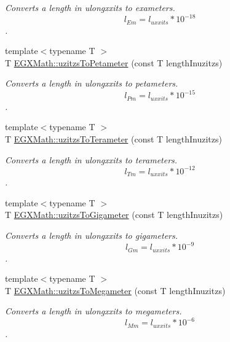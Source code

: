 \begin{DoxyCompactItemize}
\begin{DoxyCompactList}\small\item\em Converts a length in ulongxxits to exameters. \[ l_{Em}=l_{uxxits} * 10^{-18} \]. \end{DoxyCompactList}\item 
{\footnotesize template$<$typename T $>$ }\\T \mbox{\hyperlink{group___e_g_x_math-_conversions-_length_conversions-_non-_s_i-uzitzs-_s_i_gafe93d0226789fd78c2ffa4223eb6af7b}{E\+G\+X\+Math\+::uzitzs\+To\+Petameter}} (const T length\+Inuzitzs)
\begin{DoxyCompactList}\small\item\em Converts a length in ulongxxits to petameters. \[ l_{Pm}=l_{uxxits} * 10^{-15} \]. \end{DoxyCompactList}\item 
{\footnotesize template$<$typename T $>$ }\\T \mbox{\hyperlink{group___e_g_x_math-_conversions-_length_conversions-_non-_s_i-uzitzs-_s_i_gaed1a457a06ea3b69a4c63414b08b03a3}{E\+G\+X\+Math\+::uzitzs\+To\+Terameter}} (const T length\+Inuzitzs)
\begin{DoxyCompactList}\small\item\em Converts a length in ulongxxits to terameters. \[ l_{Tm}=l_{uxxits} * 10^{-12} \]. \end{DoxyCompactList}\item 
{\footnotesize template$<$typename T $>$ }\\T \mbox{\hyperlink{group___e_g_x_math-_conversions-_length_conversions-_non-_s_i-uzitzs-_s_i_ga15833fbe62cb7d741b808bc63a21df55}{E\+G\+X\+Math\+::uzitzs\+To\+Gigameter}} (const T length\+Inuzitzs)
\begin{DoxyCompactList}\small\item\em Converts a length in ulongxxits to gigameters. \[ l_{Gm}=l_{uxxits} * 10^{-9} \]. \end{DoxyCompactList}\item 
{\footnotesize template$<$typename T $>$ }\\T \mbox{\hyperlink{group___e_g_x_math-_conversions-_length_conversions-_non-_s_i-uzitzs-_s_i_ga237ffeef9137de3dd2cf5ae0eacf973e}{E\+G\+X\+Math\+::uzitzs\+To\+Megameter}} (const T length\+Inuzitzs)
\begin{DoxyCompactList}\small\item\em Converts a length in ulongxxits to megameters. \[ l_{Mm}=l_{uxxits} * 10^{-6} \]. \end{DoxyCompactList}\item 

\end{DoxyCompactItemize}
